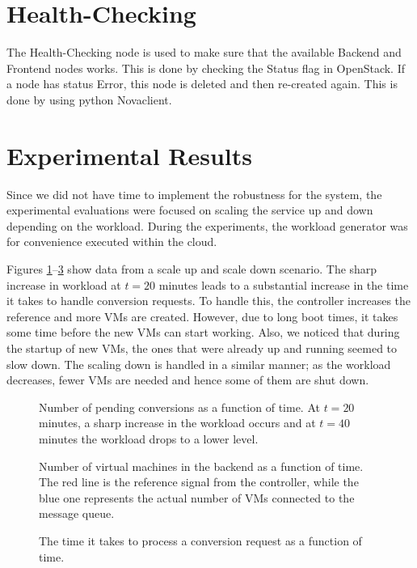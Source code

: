 \documentclass[a4paper, 10pt, english]{article}
\newlength\figureheight
\newlength\figurewidth
\begin{document}
\section{Health-Checking} \label{sec:HC}
The Health-Checking node is used to make sure that the available Backend and Frontend nodes works. This is done by checking the Status flag in OpenStack. If a node has status Error, this node is deleted and then re-created again. This is done by using python Novaclient.


\section{Experimental Results}
Since we did not have time to implement the robustness for the system, the experimental evaluations were focused on scaling the service up and down depending on the workload. During the experiments, the workload generator was for convenience executed within the cloud. 

Figures \ref{fig:conversionsPending}--\ref{fig:conversionTime} show data from a scale up and scale down scenario. The sharp increase in workload at $ t=20 $ minutes leads to a substantial increase in the time it takes to handle conversion requests. To handle this, the controller increases the reference and more VMs are created. However, due to long boot times, it takes some time before the new VMs can start working. Also, we noticed that during the startup of new VMs, the ones that were already up and running seemed to slow down. The scaling down is handled in a similar manner; as the workload decreases, fewer VMs are needed and hence some of them are shut down.

\setlength{}
\setlength{}
\begin{figure}
	\centering
	
	\caption{Number of pending conversions as a function of time. At $ t=20 $ minutes, a sharp increase in the workload occurs and at $ t=40 $ minutes the workload drops to a lower level.}
	\label{fig:conversionsPending}
\end{figure}

\begin{figure}
	\centering
	
	\caption{Number of virtual machines in the backend as a function of time. The red line is the reference signal from the controller, while the blue one represents the actual number of VMs connected to the message queue. }
	\label{fig:numberOfVMs}
\end{figure}

\begin{figure}
	\centering
	
	\caption{The time it takes to process a conversion request as a function of time.}
	\label{fig:conversionTime}
\end{figure}
\end{document}
